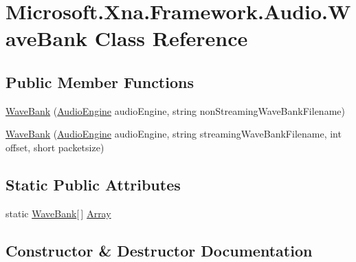 \hypertarget{class_microsoft_1_1_xna_1_1_framework_1_1_audio_1_1_wave_bank}{}\section{Microsoft.\+Xna.\+Framework.\+Audio.\+Wave\+Bank Class Reference}
\label{class_microsoft_1_1_xna_1_1_framework_1_1_audio_1_1_wave_bank}
\subsection*{Public Member Functions}
\begin{DoxyCompactItemize}
\item 
\hyperlink{class_microsoft_1_1_xna_1_1_framework_1_1_audio_1_1_wave_bank_aadc671e6c7e28878a84ed550a8c9c28c}{Wave\+Bank} (\hyperlink{class_microsoft_1_1_xna_1_1_framework_1_1_audio_1_1_audio_engine}{Audio\+Engine} audio\+Engine, string non\+Streaming\+Wave\+Bank\+Filename)
\item 
\hyperlink{class_microsoft_1_1_xna_1_1_framework_1_1_audio_1_1_wave_bank_a813baa724d3c873b172ea7e70575a1aa}{Wave\+Bank} (\hyperlink{class_microsoft_1_1_xna_1_1_framework_1_1_audio_1_1_audio_engine}{Audio\+Engine} audio\+Engine, string streaming\+Wave\+Bank\+Filename, int offset, short packetsize)
\end{DoxyCompactItemize}
\subsection*{Static Public Attributes}
\begin{DoxyCompactItemize}
\item 
static \hyperlink{class_microsoft_1_1_xna_1_1_framework_1_1_audio_1_1_wave_bank}{Wave\+Bank}\mbox{[}$\,$\mbox{]} \hyperlink{class_microsoft_1_1_xna_1_1_framework_1_1_audio_1_1_wave_bank_a05d5603d4c5bccdafcf9b9cc9633ec57}{Array}
\end{DoxyCompactItemize}


\subsection{Constructor \& Destructor Documentation}
\hypertarget{class_microsoft_1_1_xna_1_1_framework_1_1_audio_1_1_wave_bank_aadc671e6c7e28878a84ed550a8c9c28c}{}
